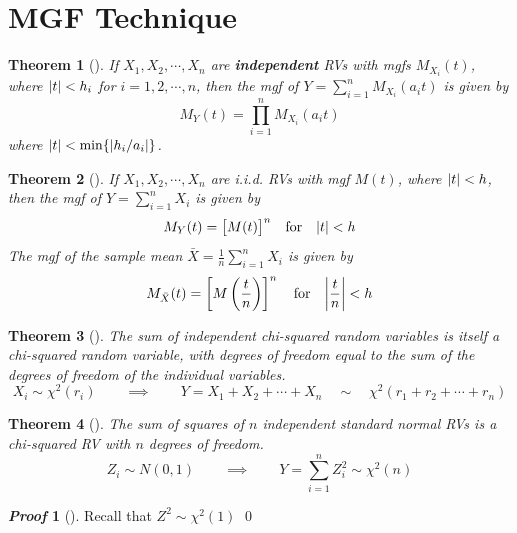 \documentclass[10pt,UTF8]{article}
\newenvironment{definition box}
{\begin{tcolorbox}[colback=blue!5!white,colframe=blue!75!black,parbox=false,before upper=\par,before lower=\par]}
{\end{tcolorbox}}
\newenvironment{theorem box}
{\begin{tcolorbox}[colback=yellow!5!white,colframe=yellow!75!black,parbox=false,before upper=\par,before lower=\par]}
{\end{tcolorbox}}
\theoremstyle{definition}
\newtheorem{definition inner}{Definition}[section]
\theoremstyle{plain}
\newtheorem{theorem inner}{Theorem}[section]
\newenvironment{theorem}[1][]
{\begin{theorem box}\begin{theorem inner}[#1]\hfill\par}
{\end{theorem inner}\end{theorem box}}
\theoremstyle{definition}
\newtheorem*{proof inner}{\textit{Proof}}
\renewenvironment{proof}[1][]
{\begin{proof inner}[#1]\hfill\par}
{\qed\end{proof inner}}
\theoremstyle{remark}
\begin{document}
\section{MGF Technique}

\begin{theorem}
    If $X_1,X_2,\cdots,X_n$ are \textbf{independent} RVs with mgfs $M_{X_i}(t)$,
    where $\abs{t}<h_i$ for $i=1,2,\cdots,n$,
    then the mgf of $\displaystyle Y=\sum_{i=1}^n M_{X_i}(a_i t)$ is given by
    \begin{equation*}
        M_Y(t) = \prod_{i=1}^n M_{X_i}(a_i t)
    \end{equation*}
    where $\abs{t}<\min\{\abs{h_i/a_i}\}$.
\end{theorem}

\begin{theorem}
    If $X_1,X_2,\cdots,X_n$ are i.i.d. RVs with mgf $M(t)$,
    where $\abs{t}<h$,
    then the mgf of $\displaystyle Y=\sum_{i=1}^n X_i$ is given by
    \begin{equation*}
        M_Y(t) = \big[M(t)\big]^n
        \qfor \abs{t} < h
    \end{equation*}
    The mgf of the sample mean $\displaystyle \bar{X}=\frac{1}{n}\sum_{i=1}^n X_i$ is given by
    \begin{equation*}
        M_{\bar{X}}(t) = \left[M\left(\frac{t}{n}\right)\right]^n
        \qfor \abs{\frac{t}{n}} < h
    \end{equation*}
\end{theorem}

\begin{theorem}
    The sum of independent chi-squared random variables is itself a chi-squared random variable,
    with degrees of freedom equal to the sum of the degrees of freedom of the individual variables.
    \begin{equation*}
        X_i \sim \chi^2(r_i) \qquad \implies \qquad
        Y = X_1 + X_2 + \cdots + X_n 
        \quad\sim\quad \chi^2\left(r_1 + r_2 + \cdots + r_n\right)
    \end{equation*}
\end{theorem}

\begin{theorem}
    The sum of squares of $n$ independent standard normal RVs is a
    chi-squared RV with $n$ degrees of freedom.
    \begin{equation*}
        Z_i \sim N(0,1) \qquad \implies \qquad
        Y = \sum_{i=1}^n Z_i^2 \sim \chi^2(n)
    \end{equation*}
\end{theorem}
\begin{proof}
    Recall that $Z^2\sim\chi^2(1)$
\end{proof}
\end{document}
